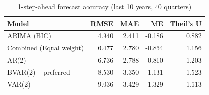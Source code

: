 \begin{table}

\caption{\label{tab:forecast-accuracy}1-step-ahead forecast accuracy (last 10 years, 40 quarters)}
\centering
\begin{tabular}[t]{lrrrr}
\toprule
Model & RMSE & MAE & ME & Theil's U\\
\midrule
ARIMA (BIC) & 4.940 & 2.411 & -0.186 & 0.882\\
Combined (Equal weight) & 6.477 & 2.780 & -0.864 & 1.156\\
AR(2) & 6.736 & 2.788 & -0.810 & 1.203\\
BVAR(2) -- preferred & 8.530 & 3.350 & -1.131 & 1.523\\
VAR(2) & 9.036 & 3.429 & -1.329 & 1.613\\
\bottomrule
\end{tabular}
\end{table}
